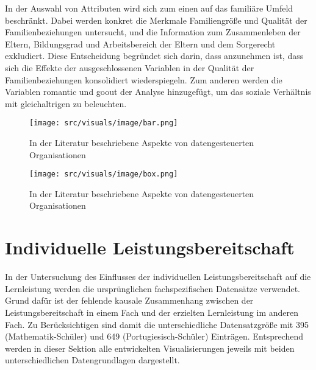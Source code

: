 In der Auswahl von Attributen wird sich zum einen auf das familiäre Umfeld beschränkt. 
Dabei werden konkret die Merkmale Familiengröße und Qualität der Familienbeziehungen untersucht, und die Information zum Zusammenleben der Eltern, Bildungsgrad und Arbeitsbereich der Eltern und dem Sorgerecht exkludiert.
Diese Entscheidung begründet sich darin, dass anzunehmen ist, dass sich die Effekte der ausgeschlossenen Variablen in der Qualität der Familienbeziehungen konsolidiert wiederspiegeln.
Zum anderen werden die Variablen romantic und goout der Analyse hinzugefügt, um das soziale Verhältnis mit gleichaltrigen zu beleuchten.

\begin{figure}[htb]
    \centering
    \texttt{[image: src/visuals/image/bar.png]}
    \caption{In der Literatur beschriebene Aspekte von datengesteuerten Organisationen}
    \label{fig:bar}
\end{figure}

\begin{figure}[htb]
    \centering
    \texttt{[image: src/visuals/image/box.png]}
    \caption{In der Literatur beschriebene Aspekte von datengesteuerten Organisationen}
    \label{fig:box}
\end{figure}

\section{Individuelle Leistungsbereitschaft}

In der Untersuchung des Einflusses der individuellen Leistungsbereitschaft auf die Lernleistung werden die ursprünglichen fachspezifischen Datensätze verwendet.
Grund dafür ist der fehlende kausale Zusammenhang zwischen der Leistungsbereitschaft in einem Fach und der erzielten Lernleistung im anderen Fach.
Zu Berücksichtigen sind damit die unterschiedliche Datensatzgröße mit 395 (Mathematik-Schüler) und 649 (Portugiesisch-Schüler) Einträgen.
Entsprechend werden in dieser Sektion alle entwickelten Visualisierungen jeweils mit beiden unterschiedlichen Datengrundlagen dargestellt.

